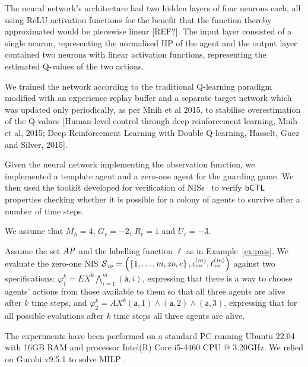 The neural network's architecture had two hidden layers of four neurons each, all using ReLU activation functions for the benefit that the function thereby approximated would be piecewise linear [REF?]. The input layer consisted of a single neuron, representing the normalised HP of the agent and the output layer contained two neurons with linear activation functions, representing the estimated Q-values of the two actions. 

We trained the network according to the traditional Q-learning paradigm modified with an experience replay buffer and a separate target network which was updated only periodically, as per Mnih et al 2015, to stabilise overestimation of the Q-values [Human-level control through deep reinforcement learning, Mnih et al, 2015; Deep Reinforcement Learning with Double Q-learning, Hasselt, Guez and Silver, 2015]. 

Given the neural network implementing the observation function, we 
implemented a template agent and a zero-one agent for the guarding game. We
then used the \venmas toolkit developed for verification of
NISs~\cite{Akintunde+20b} to verify $\sf{bCTL}$ properties checking whether it is
possible for a colony of agents to survive after a number of time steps.

We assume that $M_h = 4$, $G_r = -2$, $R_r = 1$ and $U_r = -3$. 

Assume the set $\it{AP}$ and the labelling function $\ell$ as in
Example~\ref{ex:pnis}. We evaluate the zero-one NIS
$\mathcal S_{zo} = \left ( \left \{ 1,\ldots,m,zo,e \right \}, \iota^{({m})}_{zo}, \ell^{(m)}_{zo} \right )$
against two specifications:
$\varphi^k_1 = EX^k \bigwedge_{i=1}^m(\mathsf{a},i)$,
expressing that there is a way to choose agents' actions from those available
to them so that all three agents are alive after $k$ time steps, and
$\varphi^k_2 = AX^k (\mathsf{a},1) \land (\mathsf{a},2) \land (\mathsf{a},3)$,
expressing that for all possible evolutions after $k$ time steps all three
agents are alive.

The experiments have been performed on a standard PC running Ubuntu 22.04 with
16GB RAM and processor Intel(R) Core i5-4460 CPU @ 3.20GHz. We relied on Gurobi
v9.5.1 to solve MILP \cite{Gurobi+16a}.



